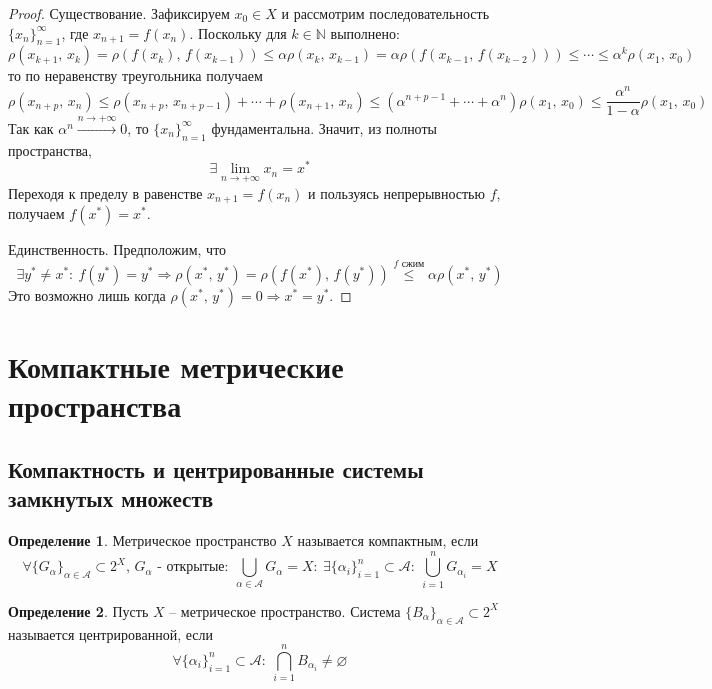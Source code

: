 \documentclass[a4paper,12pt]{article}
\renewcommand{\leq}{\ensuremath{\leqslant}}
\renewcommand{\emptyset}{\ensuremath{\varnothing}}
\theoremstyle{plain}
\theoremstyle{definition}
\newtheorem{definition}{Определение}[section]
\theoremstyle{remark}
\begin{document}
\begin{proof}
	Существование. Зафиксируем $x_0 \in X$ и рассмотрим последовательность $\{x_n\}_{n = 1}^\infty$, где $x_{n + 1} = f(x_n)$. Поскольку для $k \in \mathbb{N}$ выполнено:
	\[
		\rho(x_{k + 1},\, x_k) = \rho(f(x_k),\, f(x_{k - 1})) \leq \alpha\rho(x_k,\, x_{k - 1}) = \alpha\rho(f(x_{k - 1},\, f(x_{k - 2}))) \leq \cdots \leq \alpha^k\rho(x_1,\, x_0)
	\]
	то по неравенству треугольника получаем
	\[
		\rho(x_{n + p},\, x_n) \leq \rho(x_{n + p},\, x_{n + p - 1}) + \cdots + \rho(x_{n + 1},\, x_n) \leq (\alpha^{n + p - 1} + \cdots + \alpha^n) \rho(x_1,\, x_0) \leq \frac{\alpha^n}{1 - \alpha}\rho(x_1,\, x_0)
	\]
	Так как $\alpha^n \overset{n \to +\infty}{\to} 0$, то $\{x_n\}_{n = 1}^\infty$ фундаментальна. Значит, из полноты пространства,
	\[
		\exists \lim_{n \to +\infty} x_n = x^*
	\]
	Переходя к пределу в равенстве $x_{n + 1} = f(x_n)$ и пользуясь непрерывностью $f$, получаем $f(x^*) = x^*$.

	Единственность. Предположим, что
	\[
		\exists y^* \neq x^* :\: f(y^*) = y^* \Rightarrow \rho(x^*,\, y^*) = \rho(f(x^*),\, f(y^*)) \overset{f \text{ сжим}}{\leq} \alpha\rho(x^*,\, y^*)
	\]
	Это возможно лишь когда $\rho(x^*,\, y^*) = 0 \Rightarrow x^* = y^*$.
\end{proof}

\section{Компактные метрические пространства}
\subsection{Компактность и центрированные системы замкнутых множеств}
\begin{definition}
	Метрическое пространство $X$ называется компактным, если
	\[
		\forall \{G_\alpha\}_{\alpha \in \mathcal{A}} \subset 2^X,\, G_\alpha \text{ - открытые} :\: \bigcup_{\alpha \in \mathcal{A}} G_\alpha = X :\: \exists \{\alpha_i\}_{i = 1}^n \subset \mathcal{A} :\: \bigcup_{i = 1}^n G_{\alpha_i} = X
	\]
\end{definition}

\begin{definition}
	Пусть $X$ -- метрическое пространство. Система $\{B_\alpha\}_{\alpha \in \mathcal{A}} \subset 2^X$ называется центрированной, если
	\[
		\forall \{\alpha_i\}_{i=1}^n \subset \mathcal{A} :\: \bigcap_{i = 1}^n B_{\alpha_i} \neq \emptyset
	\]
\end{definition}
\end{document}
